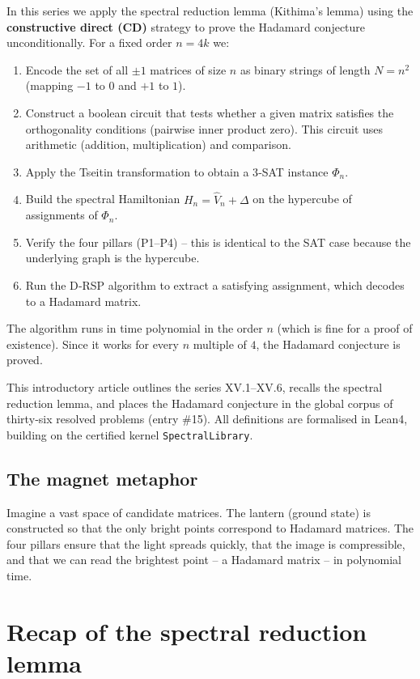 \documentclass[11pt,a4paper]{article}
\begin{document}
In this series we apply the spectral reduction lemma (Kithima's lemma) using the \textbf{constructive direct (CD)} strategy to prove the Hadamard conjecture unconditionally. For a fixed order $n=4k$ we:
\begin{enumerate}
\item Encode the set of all $\pm1$ matrices of size $n$ as binary strings of length $N = n^2$ (mapping $-1$ to $0$ and $+1$ to $1$).
\item Construct a boolean circuit that tests whether a given matrix satisfies the orthogonality conditions (pairwise inner product zero). This circuit uses arithmetic (addition, multiplication) and comparison.
\item Apply the Tseitin transformation to obtain a 3‑SAT instance $\Phi_n$.
\item Build the spectral Hamiltonian $H_n = \hat{V}_n + \Delta$ on the hypercube of assignments of $\Phi_n$.
\item Verify the four pillars (P1–P4) – this is identical to the SAT case because the underlying graph is the hypercube.
\item Run the D‑RSP algorithm to extract a satisfying assignment, which decodes to a Hadamard matrix.
\end{enumerate}
The algorithm runs in time polynomial in the order $n$ (which is fine for a proof of existence). Since it works for every $n$ multiple of $4$, the Hadamard conjecture is proved.

This introductory article outlines the series XV.1–XV.6, recalls the spectral reduction lemma, and places the Hadamard conjecture in the global corpus of thirty‑six resolved problems (entry \#15). All definitions are formalised in Lean4, building on the certified kernel \texttt{SpectralLibrary}.

\subsection{The magnet metaphor}

Imagine a vast space of candidate matrices. The lantern (ground state) is constructed so that the only bright points correspond to Hadamard matrices. The four pillars ensure that the light spreads quickly, that the image is compressible, and that we can read the brightest point – a Hadamard matrix – in polynomial time.

\section{Recap of the spectral reduction lemma}
\end{document}
